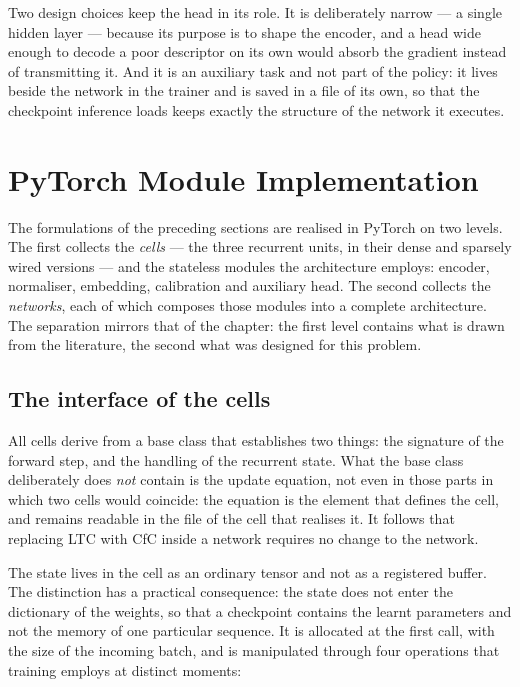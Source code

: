 Two design choices keep the head in its role. It is deliberately narrow --- a
single hidden layer --- because its purpose is to shape the encoder, and a head
wide enough to decode a poor descriptor on its own would absorb the gradient
instead of transmitting it. And it is an auxiliary task and not part of the
policy: it lives beside the network in the trainer and is saved in a file of its
own, so that the checkpoint inference loads keeps exactly the structure of the
network it executes.

\section{PyTorch Module Implementation}
\label{sec:module-implementation}

The formulations of the preceding sections are realised in PyTorch on two
levels. The first collects the \emph{cells} --- the three recurrent units, in
their dense and sparsely wired versions --- and the stateless modules the
architecture employs: encoder, normaliser, embedding, calibration and auxiliary
head. The second collects the \emph{networks}, each of which composes those
modules into a complete architecture. The separation mirrors that of the
chapter: the first level contains what is drawn from the literature, the second
what was designed for this problem.

\subsection{The interface of the cells}

All cells derive from a base class that establishes two things: the signature of
the forward step, and the handling of the recurrent state. What the base class
deliberately does \emph{not} contain is the update equation, not even in those
parts in which two cells would coincide: the equation is the element that
defines the cell, and remains readable in the file of the cell that realises it.
It follows that replacing LTC with CfC inside a network requires no change to
the network.

The state lives in the cell as an ordinary tensor and not as a registered
buffer. The distinction has a practical consequence: the state does not enter
the dictionary of the weights, so that a checkpoint contains the learnt
parameters and not the memory of one particular sequence. It is allocated at the
first call, with the size of the incoming batch, and is manipulated through four
operations that training employs at distinct moments:

